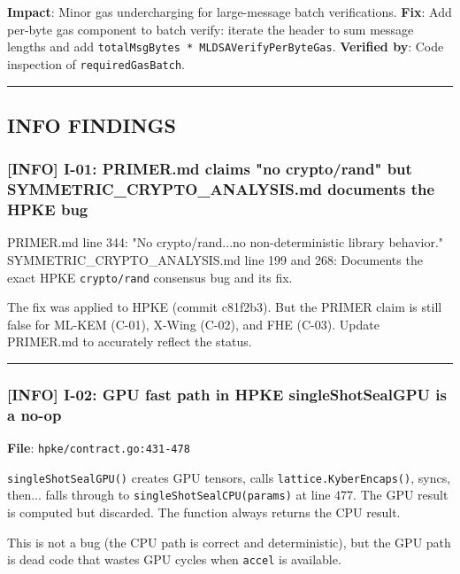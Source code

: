 \documentclass[
]{article}
\begin{document}
\textbf{Impact}: Minor gas undercharging for large-message batch
verifications. \textbf{Fix}: Add per-byte gas component to batch verify:
iterate the header to sum message lengths and add
\texttt{totalMsgBytes\ *\ MLDSAVerifyPerByteGas}. \textbf{Verified by}:
Code inspection of \texttt{requiredGasBatch}.

\begin{center}\rule{0.5\linewidth}{0.5pt}\end{center}

\subsection{INFO FINDINGS}\label{info-findings}

\subsubsection{{[}INFO{]} I-01: PRIMER.md claims "no crypto/rand" but
SYMMETRIC\_CRYPTO\_ANALYSIS.md documents the HPKE
bug}\label{info-i-01-primermd-claims-no-cryptorand-but-symmetric_crypto_analysismd-documents-the-hpke-bug}

PRIMER.md line 344: "No crypto/rand...no non-deterministic library
behavior." SYMMETRIC\_CRYPTO\_ANALYSIS.md line 199 and 268: Documents
the exact HPKE \texttt{crypto/rand} consensus bug and its fix.

The fix was applied to HPKE (commit c81f2b3). But the PRIMER claim is
still false for ML-KEM (C-01), X-Wing (C-02), and FHE (C-03). Update
PRIMER.md to accurately reflect the status.

\begin{center}\rule{0.5\linewidth}{0.5pt}\end{center}

\subsubsection{{[}INFO{]} I-02: GPU fast path in HPKE singleShotSealGPU
is a
no-op}\label{info-i-02-gpu-fast-path-in-hpke-singleshotsealgpu-is-a-no-op}

\textbf{File}: \texttt{hpke/contract.go:431-478}

\texttt{singleShotSealGPU()} creates GPU tensors, calls
\texttt{lattice.KyberEncaps()}, syncs, then... falls through to
\texttt{singleShotSealCPU(params)} at line 477. The GPU result is
computed but discarded. The function always returns the CPU result.

This is not a bug (the CPU path is correct and deterministic), but the
GPU path is dead code that wastes GPU cycles when \texttt{accel} is
available.
\end{document}

